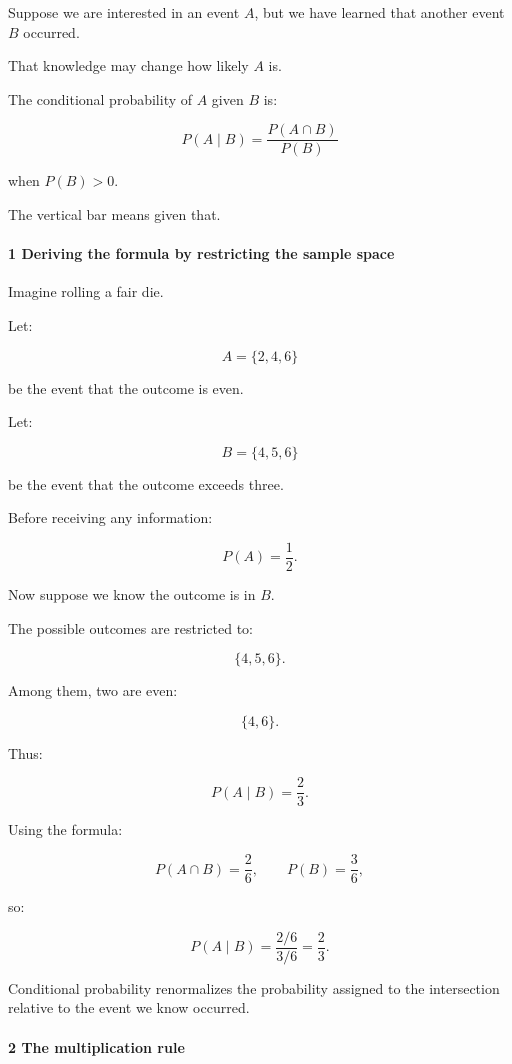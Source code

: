 Suppose we are interested in an event \(A\), but we have learned that another event \(B\) occurred.

That knowledge may change how likely \(A\) is.

The conditional probability of \(A\) given \(B\) is:

\[
 \boxed{ P(A\mid B) = \frac{P(A\cap B)}{P(B)} }
\]

when \(P(B)>0\).

The vertical bar means given that.

\paragraph{1 Deriving the formula by restricting the sample space}\label{deriving-the-formula-by-restricting-the-sample-space}

Imagine rolling a fair die.

Let:

\[
 A=\{2,4,6\}
\]

be the event that the outcome is even.

Let:

\[
 B=\{4,5,6\}
\]

be the event that the outcome exceeds three.

Before receiving any information:

\[
 P(A)=\frac12.
\]

Now suppose we know the outcome is in \(B\).

The possible outcomes are restricted to:

\[
 \{4,5,6\}.
\]

Among them, two are even:

\[
 \{4,6\}.
\]

Thus:

\[
 P(A\mid B)=\frac23.
\]

Using the formula:

\[
 P(A\cap B)=\frac26, \qquad P(B)=\frac36,
\]

so:

\[
 P(A\mid B) = \frac{2/6}{3/6} =\boxed{\frac23}.
\]

Conditional probability renormalizes the probability assigned to the intersection relative to the event we know occurred.

\paragraph{2 The multiplication rule}\label{the-multiplication-rule}

